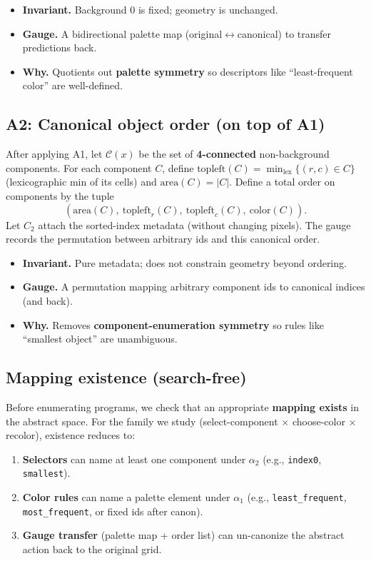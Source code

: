 \documentclass[11pt]{article}
\newcommand{\code}[1]{\texttt{#1}}
\begin{document}
\begin{itemize}
\item \textbf{Invariant.} Background $0$ is fixed; geometry is unchanged.
\item \textbf{Gauge.} A bidirectional palette map (original$\leftrightarrow$canonical) to transfer predictions back.
\item \textbf{Why.} Quotients out \textbf{palette symmetry} so descriptors like ``least-frequent color'' are well-defined.
\end{itemize}


\subsection{A2: Canonical object order (on top of A1)}

After applying A1, let $\mathcal{C}(x)$ be the set of \textbf{4-connected} non-background components. For each component $C$, define
$\mathrm{topleft}(C)=\min_{\mathrm{lex}}\{(r,c)\in C\}$ (lexicographic min of its cells) and $\mathrm{area}(C)=|C|$.
Define a total order on components by the tuple
\[
(\mathrm{area}(C),~\mathrm{topleft}_r(C),~\mathrm{topleft}_c(C),~\mathrm{color}(C)).
\]
Let $C_2$ attach the sorted-index metadata (without changing pixels). The gauge records the permutation between arbitrary ids and this canonical order.

\begin{itemize}
\item \textbf{Invariant.} Pure metadata; does not constrain geometry beyond ordering.
\item \textbf{Gauge.} A permutation mapping arbitrary component ids to canonical indices (and back).
\item \textbf{Why.} Removes \textbf{component-enumeration symmetry} so rules like ``smallest object'' are unambiguous.
\end{itemize}

\subsection{Mapping existence (search-free)}

Before enumerating programs, we check that an appropriate \textbf{mapping exists} in the abstract space. For the family we study (select-component $\times$ choose-color $\times$ recolor), existence reduces to:
\begin{enumerate}
\item \textbf{Selectors} can name at least one component under $\alpha_2$ (e.g., \code{index0}, \code{smallest}).
\item \textbf{Color rules} can name a palette element under $\alpha_1$ (e.g., \code{least\_frequent}, \code{most\_frequent}, or fixed ids after canon).
\item \textbf{Gauge transfer} (palette map + order list) can un-canonize the abstract action back to the original grid.
\end{enumerate}
\end{document}
